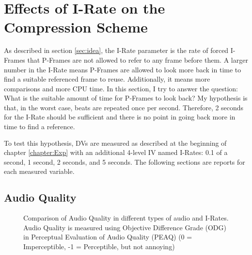 \section{Effects of I-Rate on the Compression Scheme}
\label{sec:i-rates}

As described in section \ref{sec:idea}, the I-Rate parameter is the rate of forced I-Frames that P-Frames are not allowed to refer to any frame before them. A larger number in the I-Rate means P-Frames are allowed to look more back in time to find a suitable referenced frame to reuse. Additionally, it means more comparisons and more CPU time. In this section, I try to answer the question: What is the suitable amount of time for P-Frames to look back? My hypothesis is that, in the worst case, beats are repeated once per second. Therefore, 2 seconds for the I-Rate should be sufficient and there is no point in going back more in time to find a reference.

To test this hypothesis, DVs are measured as described at the beginning of chapter \ref{chapter:Exp} with an additional 4-level IV named I-Rates: 0.1 of a second, 1 second, 2 seconds, and 5 seconds. The following sections are reports for each measured variable.

\subsection{Audio Quality}

\begin{figure}[ht]
  
  \caption[Comparison of Audio Quality in different types of audio and I-Rates.]{Comparison of Audio Quality in different types of audio and I-Rates. Audio Quality is measured using Objective Difference Grade (ODG) in Perceptual Evaluation of Audio Quality (PEAQ) (0 = Imperceptible, -1 = Perceptible, but not annoying)}
  \label{fig:irate-peaq}
\end{figure}

